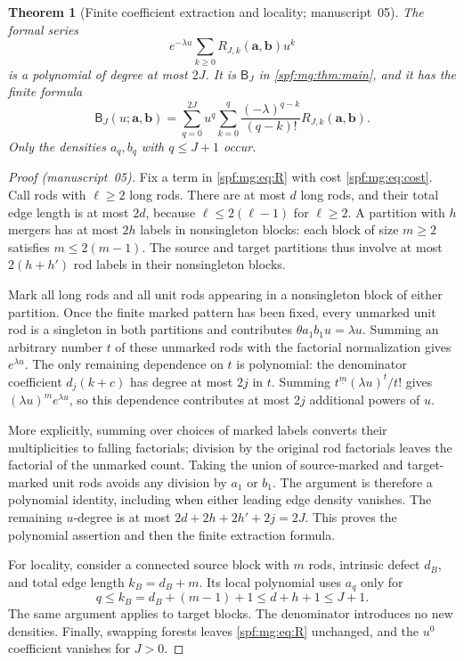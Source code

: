 \documentclass[11pt]{article}
\numberwithin{equation}{section}
\newtheorem{theorem}{Theorem}[section]
\theoremstyle{definition}
\theoremstyle{remark}
\theoremstyle{definition}
\newcommand{\mga}{\boldsymbol a}
\newcommand{\mgb}{\boldsymbol b}
\begin{document}
\begin{theorem}[Finite coefficient extraction and locality; manuscript~05]
\label{spf:mg:thm:finite}
The formal series
\begin{equation}
 e^{-\lambda u}\sum_{k\ge0}R_{J,k}(\mga,\mgb)u^k
 \label{spf:mg:eq:B-infinite}
\end{equation}
is a polynomial of degree at most $2J$. It is $\mathsf B_J$ in
\cref{spf:mg:thm:main}, and it has the finite formula
\begin{equation}
 \boxed{\displaystyle
 \mathsf B_J(u;\mga,\mgb)=
 \sum_{q=0}^{2J}u^q\sum_{k=0}^{q}
       \frac{(-\lambda)^{q-k}}{(q-k)!}R_{J,k}(\mga,\mgb).}
 \label{spf:mg:eq:finite-B}
\end{equation}
Only the densities $a_q,b_q$ with $q\le J+1$ occur.
\end{theorem}
\begin{proof}[Proof (manuscript~05)]
Fix a term in \eqref{spf:mg:eq:R} with cost \eqref{spf:mg:eq:cost}. Call rods with
$\ell\ge2$ long rods. There are at most $d$ long rods, and their total
edge length is at most $2d$, because $\ell\le2(\ell-1)$ for $\ell\ge2$.
A partition with $h$ mergers has at most $2h$ labels in nonsingleton
blocks: each block of size $m\ge2$ satisfies $m\le2(m-1)$.
The source and target partitions thus involve at most $2(h+h')$ rod
labels in their nonsingleton blocks.

Mark all long rods and all unit rods appearing in a nonsingleton block
of either partition. Once the finite marked pattern has been fixed,
every unmarked unit rod is a singleton in both partitions and contributes
$\theta a_1b_1u=\lambda u$. Summing an arbitrary number $t$ of these
unmarked rods with the factorial normalization gives $e^{\lambda u}$.
The only remaining dependence on $t$ is polynomial: the denominator
coefficient $d_j(k+c)$ has degree at most $2j$ in $t$. Summing
$t^{\underline m}(\lambda u)^t/t!$ gives
$(\lambda u)^m e^{\lambda u}$, so this dependence contributes at most
$2j$ additional powers of $u$.

More explicitly, summing over choices of marked labels converts their
multiplicities to falling factorials; division by the original rod
factorials leaves the factorial of the unmarked count. Taking the union
of source-marked and target-marked unit rods avoids any division by
$a_1$ or $b_1$. The argument is therefore a polynomial identity, including
when either leading edge density vanishes. The remaining $u$-degree is
at most
$2d+2h+2h'+2j=2J$. This proves the polynomial assertion and then the
finite extraction formula.

For locality, consider a connected source block with $m$ rods, intrinsic
defect $d_B$, and total edge length $k_B=d_B+m$. Its local polynomial
uses $a_q$ only for
\[
 q\le k_B=d_B+(m-1)+1\le d+h+1\le J+1.
\]
The same argument applies to target blocks. The denominator introduces
no new densities. Finally, swapping forests leaves \eqref{spf:mg:eq:R}
unchanged, and the $u^0$ coefficient vanishes for $J>0$.
\end{proof}
\end{document}
